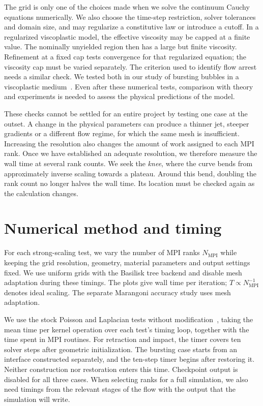 \documentclass[11pt,a4paper]{article}
\begin{document}
The grid is only one of the choices made when we solve the continuum
Cauchy equations numerically. We also choose the time-step restriction,
solver tolerances and domain size, and may regularize a constitutive law
or introduce a cutoff. In a regularized viscoplastic model, the effective
viscosity may be capped at a finite value. The nominally unyielded region then has a large but finite
viscosity. Refinement at a fixed cap tests convergence for that regularized
equation; the viscosity cap must be varied separately.
The criterion used to identify flow arrest needs a similar check. We tested
both in our study of bursting bubbles in a viscoplastic
medium~\cite{sanjay2021-bursting}. Even after these numerical tests,
comparison with theory and experiments is needed to assess the physical
predictions of the model.

These checks cannot be settled for an entire project by testing one case
at the outset. A change in the physical parameters can produce a thinner
jet, steeper gradients or a different flow regime, for which the same mesh
is insufficient. Increasing the resolution also changes the amount of work
assigned to each MPI rank. Once we have established an adequate resolution,
we therefore measure the wall time at several rank counts. We seek the
\emph{knee}, where the curve bends from approximately inverse scaling
towards a plateau. Around this bend, doubling the rank count no longer
halves the wall time. Its location must be checked again as the calculation
changes.

\section{Numerical method and timing}

For each strong-scaling test, we vary the number of MPI ranks
$N_{\mathrm{MPI}}$ while keeping the grid resolution, geometry, material
parameters and output settings fixed. We use uniform grids with the
Basilisk tree backend and disable mesh adaptation during these timings.
The plots give wall time per iteration; $T\propto N_{\mathrm{MPI}}^{-1}$
denotes ideal scaling. The separate Marangoni accuracy study uses mesh
adaptation.

We use the stock Poisson and Laplacian tests without
modification~\cite{basilisk-mpi-circle,basilisk-mpi-laplacian}, taking the
mean time per kernel operation over each test's timing loop, together with
the time spent in MPI routines.
For retraction and impact, the timer covers ten solver steps after
geometric initialization. The bursting case starts from an interface
constructed separately, and the ten-step timer begins after restoring it.
Neither construction nor restoration enters this time. Checkpoint output is
disabled for all three cases. When selecting ranks for a full simulation,
we also need timings from the relevant stages of the flow with the output
that the simulation will write.
\end{document}
